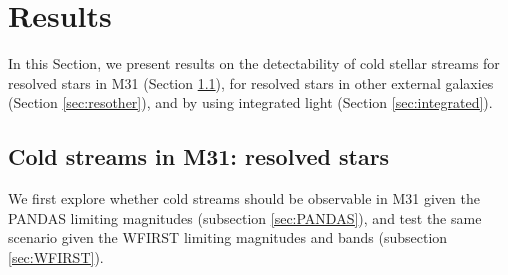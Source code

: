 \documentclass[twocolumn]{aastex62}
\newcommand{\todo}[1]{{\color{red} TODO: #1}}
\begin{document}
%



\section{Results}\label{sec:results}
In this Section, we present results on the detectability of cold stellar streams for resolved stars in M31 (Section \ref{sec:resolved}), for resolved stars in other external galaxies (Section \ref{sec:resother}), and by using integrated light (Section \ref{sec:integrated}). 
 

\subsection{Cold streams in M31: resolved stars}
\label{sec:resolved}
We first explore whether cold streams should be observable in M31 given the PANDAS limiting magnitudes (subsection \ref{sec:PANDAS}), and test the same scenario given the WFIRST limiting magnitudes and bands (subsection \ref{sec:WFIRST}). %
\end{document}

